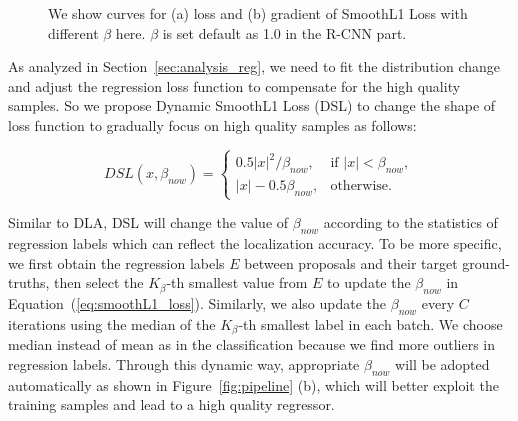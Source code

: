 \documentclass[runningheads]{llncs}
\begin{document}
\begin{figure}[!t]
    \centering
    \caption{We show curves for (a) loss and (b) gradient of SmoothL1 Loss with different $\beta$ here. $\beta$ is set default as 1.0 in the R-CNN part.}
    \label{fig:smoothL1}
\end{figure}

As analyzed in Section~\ref{sec:analysis_reg}, we need to fit the distribution change and adjust the regression loss function to compensate for the high quality samples. So we propose Dynamic SmoothL1 Loss (DSL) to change the shape of loss function to gradually focus on high quality samples as follows:

\begin{equation}
    DSL(x, \beta_{now}) =
    \begin{cases}
        0.5|x|^2/\beta_{now}, & \mbox{if }|x|<\beta_{now}, \\
        |x|-0.5\beta_{now}, & \mbox{otherwise}.
    \end{cases}
    \label{eq:DSL}
\end{equation}

Similar to DLA, DSL will change the value of $\beta_{now}$ according to the statistics of regression labels which can reflect the localization accuracy. To be more specific, we first obtain the regression labels $E$ between proposals and their target ground-truths, then select the $K_\beta$-th smallest value from $E$ to update the $\beta_{now}$ in Equation~(\ref{eq:smoothL1_loss}). Similarly, we also update the $\beta_{now}$ every $C$ iterations using the median of the $K_{\beta}$-th smallest label in each batch. We choose median instead of mean as in the classification because we find more outliers in regression labels.
Through this dynamic way, appropriate $\beta_{now}$ will be adopted automatically as shown in Figure~\ref{fig:pipeline} (b), which will better exploit the training samples and lead to a high quality regressor.
\end{document}
